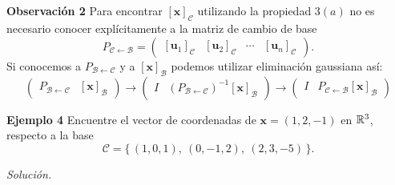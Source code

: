 
\subsection{}

\begin{frame}%

\begin{alertblock}{\textbf{Observación 2}}\justifying
	Para encontrar $\left[ \mathbf{x} \right]_{\mathcal{C}}$ utilizando la propiedad 3$(a)$ no es necesario conocer explícitamente a
	la matriz de cambio de base
	\[	
	P_{\mathcal{C} \leftarrow\mathcal{B}} =
	\left( 
	\begin{array}{c|c|c|c} \left[ \mathbf{u}_1 \right]_{\mathcal{C}} & \left[ \mathbf{u}_2 \right]_{\mathcal{C}} & \cdots & \left[ \mathbf{u}_n \right]_{\mathcal{C}}
	\end{array} 
	\right).
	\]
	Si conocemos a $P_{\mathcal{B} \leftarrow\mathcal{C}}$ y a $\left[ \mathbf{x} \right]_{\mathcal{B}}$ podemos utilizar eliminación gaussiana así:
	\[	
	\left( 
	\begin{array}{c|c} P_{\mathcal{B} \leftarrow\mathcal{C}} & \left[ \mathbf{x} \right]_{\mathcal{B}}
	\end{array} 
	\right)
	\longrightarrow
	\left( 
	\begin{array}{c|c} I & \left(P_{\mathcal{B} \leftarrow\mathcal{C}}\right)^{-1}\left[ \mathbf{x} \right]_{\mathcal{B}}
	\end{array} 
	\right)
	\longrightarrow
	\left( 
	\begin{array}{c|c} I & P_{\mathcal{C} \leftarrow\mathcal{B}}\left[ \mathbf{x} \right]_{\mathcal{B}}
	\end{array} 
	\right)
	\]
\end{alertblock}

\begin{ej}{\textbf{Ejemplo 4}}
	Encuentre el vector de coordenadas de $\mathbf{x}=(1,2,-1)$ en $\mathbb{R}^3$, respecto a la base
	\[
	\mathcal{C} = \Big\{ \, (1,0,1), \ (0,-1,2), \ (2,3,-5) \, \Big\}.
	\]
\end{ej}
\textit{Solución.}

\end{frame}


